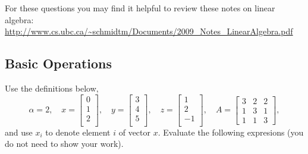 \documentclass{article}
\def\blu#1{{\color{blu}#1}}
\begin{document}
For these questions you may find it helpful to review these notes on linear algebra:\\
\url{http://www.cs.ubc.ca/~schmidtm/Documents/2009_Notes_LinearAlgebra.pdf}

\subsection{Basic Operations}

Use the definitions below,
\[
\alpha = 2,\quad
x = \left[\begin{array}{c}
0\\
1\\
2\\
\end{array}\right], \quad 
y = \left[\begin{array}{c}
3\\
4\\
5\\
\end{array}\right],\quad
z = \left[\begin{array}{c}
1\\
2\\
-1\\
\end{array}\right],\quad
A = \left[\begin{array}{ccc}
3 & 2 & 2\\
1 & 3 & 1\\
1 & 1 & 3
\end{array}\right],
\]
and use $x_i$ to denote element $i$ of vector $x$.
\blu{Evaluate the following expresions} (you do not need to show your work).
\end{document}
